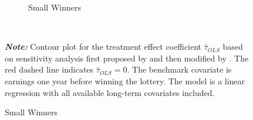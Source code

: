 \documentclass[letterpaper,12pt,leqno]{article}
\begin{document}
\begin{figure}[!ht]
\begin{minipage}[c]{1\textwidth}
\begin{subfigure}{0.45\linewidth}
            \caption{Small Winners}
        \end{subfigure}
    \end{minipage}%
    \\\raggedright
     {\footnotesize\textbf{\textit{Note:}} Contour plot for the treatment effect coefficient $\hat{\tau}_{OLS}$ based on sensitivity analysis first proposed by \citet{imbens2003} and then modified by \citet{cinelli2020making}. The red dashed line indicates $\hat\tau_{OLS} = 0$. The benchmark covariate is earnings one year before winning the lottery. The model is a linear regression with all available long-term covariates included. }
\end{figure}
\clearpage
\end{document}
